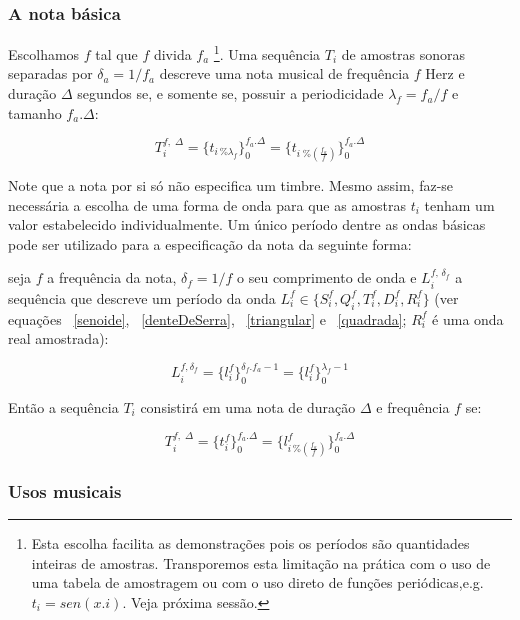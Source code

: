 \subsubsection{A nota básica}

Escolhamos $f$ tal que $f$ divida $f_a$  
 \footnote{Esta escolha facilita as demonstrações pois os períodos são quantidades inteiras de amostras. Transporemos esta limitação na prática com o uso de uma tabela de amostragem ou com o uso direto de funções periódicas,e.g. $t_i=sen(x.i)$. Veja próxima sessão.}. 
Uma sequência $T_i$ de amostras sonoras separadas por $\delta_a=1/f_a$ descreve uma nota musical de frequência $f$ Herz e duração $\Delta$ segundos se, e somente se, possuir a periodicidade $\lambda_f=f_a/f$ e tamanho $f_a . \Delta$:

\begin{equation}
T_i^{f,\; \Delta}=\{t_{i \, \% \lambda_f} \}_0^{f_a . \Delta}=\{t_{i \; \% \left( \frac{f_a}{f} \right) } \}_0^{f_a . \Delta}
\end{equation}

Note que a nota por si só não especifica um timbre. Mesmo assim, faz-se necessária a escolha de uma forma de onda para que as amostras $t_i$ tenham um valor estabelecido individualmente. Um único período dentre as ondas básicas pode ser utilizado para a especificação da nota da seguinte forma:

seja $f$ a frequência da nota, $\delta_f=1/f$ o seu comprimento de onda e $L_i^{f,\, \delta_f} $ a sequência que descreve um período da onda $L_i^f \in \{S_i^f,Q_i^f,T_i^f,D_i^f,R_i^f \}$ (ver equações ~\ref{senoide}, ~\ref{denteDeSerra}, ~\ref{triangular} e ~\ref{quadrada}; $R_i^f$ é uma onda real amostrada):

\begin{equation}\label{periodoUnico}
L_i^{f , \delta_f } = \{ l_i^f \}_0^{\delta_f . f_a -1}=\{ l_i^f \}_0^{\lambda_f-1}
\end{equation}

Então a sequência $T_i$ consistirá em uma nota de duração $\Delta$ e frequência $f$ se:

\begin{equation}
T_i^{f,\; \Delta}=\{t_i^f\}_0^{f_a . \Delta}=\{l^f_{i\,\%\left(\frac{f_a}{f}\right)}\}_0^{f_a . \Delta}
\end{equation}


\subsubsection{Usos musicais}


